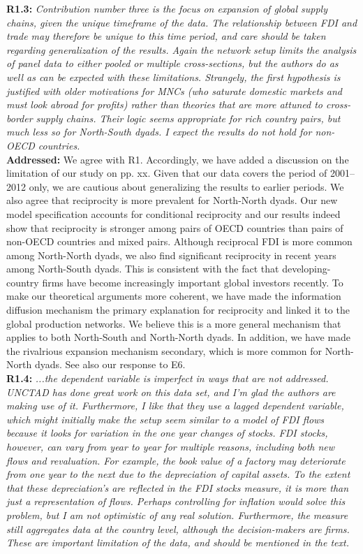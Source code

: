 \documentclass[a4paper,11pt]{texMemo}
\begin{document}
\noindent \textbf{R1.3:} \emph{Contribution number three is the focus on expansion of global supply chains, given the unique timeframe of the data. The relationship between FDI and trade may therefore be unique to this time period, and care should be taken regarding generalization of the results. Again the network setup limits the analysis of panel data to either pooled or multiple cross-sections, but the authors do as well as can be expected with these limitations. Strangely, the first hypothesis is justified with older motivations for MNCs (who saturate domestic markets and must look abroad for profits) rather than theories that are more attuned to cross-border supply chains. Their logic seems appropriate for rich country pairs, but much less so for North-South dyads. I expect the results do not hold for non-OECD countries.}\\

\noindent \textbf{Addressed:}  We agree with R1. Accordingly, we have added a discussion on the limitation of our study on pp. xx. Given that our data covers the period of 2001--2012 only, we are cautious about generalizing the results to earlier periods. We also agree that reciprocity is more prevalent for North-North dyads. Our new model specification accounts for conditional reciprocity and our results indeed show that reciprocity is stronger among pairs of OECD countries than pairs of non-OECD countries and mixed pairs. Although reciprocal FDI is more common among North-North dyads, we also find significant reciprocity in recent years among North-South dyads. This is consistent with the fact that developing-country firms have become increasingly important global investors recently. To make our theoretical arguments more coherent, we have made the information diffusion mechanism the primary explanation for reciprocity and linked it to the global production networks. We believe this is a more general mechanism that applies to both North-South and North-North dyads. In addition, we have made the rivalrious expansion mechanism secondary, which is more common for North-North dyads. See also our response to E6.  \\


\noindent \textbf{R1.4:} \emph{...the dependent variable is imperfect in ways that are not addressed. UNCTAD has done great work on this data set, and I'm glad the authors are making use of it. Furthermore, I like that they use a lagged dependent variable, which might initially make the setup seem similar to a model of FDI flows because it looks for variation in the one year changes of stocks. FDI stocks, however, can vary from year to year for multiple reasons, including both new flows and revaluation. For example, the book value of a factory may deteriorate from one year to the next due to the depreciation of capital assets. To the extent that these depreciation's are reflected in the FDI stocks measure, it is more than just a representation of flows. Perhaps controlling for inflation would solve this problem, but I am not optimistic of any real solution. Furthermore, the measure still aggregates data at the country level, although the decision-makers are firms. These are important limitation of the data, and should be mentioned in the text.}\\
\end{document}
